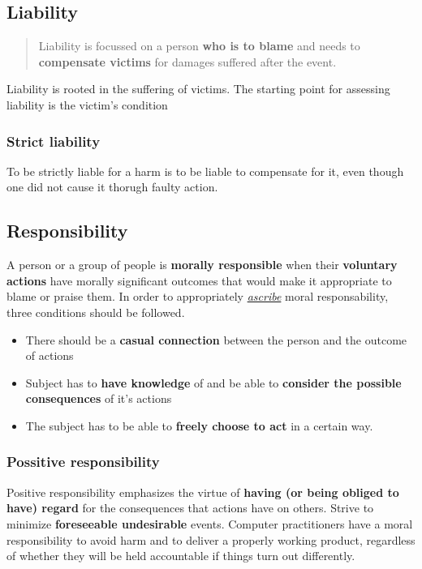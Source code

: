 \documentclass{article}
\newcommand{\worddef}[1]{\hyperref[sec:reference]{\textit{#1}}}
\begin{document}
\subsection{Liability}
\begin{quote}
Liability is focussed on a person \textbf{who is to blame} and needs to \textbf{compensate victims} for damages suffered after the event.
\end{quote}
\begin{flushleft}
Liability is rooted in the suffering of victims. The starting point for assessing liability is the victim's condition
\end{flushleft}

\subsubsection{Strict liability}
\begin{flushleft}
To be strictly liable for a harm is to be liable to compensate for it, even though one did not cause it thorugh faulty action.
\end{flushleft}

\subsection{Responsibility}

\begin{flushleft}
A person or a group of people is \textbf{morally responsible} when their \textbf{voluntary actions} have morally significant outcomes that would make it appropriate to blame or praise them. In order to appropriately \worddef{ascribe} moral responsability, three conditions should be followed.
\end{flushleft}
\begin{itemize}
  \item There should be a \textbf{casual connection} between the person and the outcome of actions
  \item Subject has to \textbf{have knowledge} of and be able to \textbf{consider the possible consequences} of it's actions
  \item The subject has to be able to \textbf{freely choose to act} in a certain way.
\end{itemize}

\subsubsection{Possitive responsibility}
\begin{flushleft}
Positive responsibility emphasizes the virtue of \textbf{having (or being obliged to have) regard} for the consequences that actions have on others. Strive to minimize \textbf{foreseeable undesirable} events. Computer practitioners have a moral responsibility to avoid harm and to deliver a properly working product, regardless of whether they will be held accountable if things turn out differently.
\end{flushleft}
\end{document}
